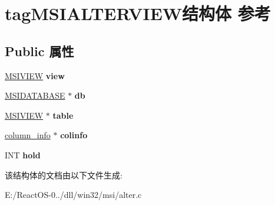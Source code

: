 \hypertarget{structtag_m_s_i_a_l_t_e_r_v_i_e_w}{}\section{tag\+M\+S\+I\+A\+L\+T\+E\+R\+V\+I\+E\+W结构体 参考}
\label{structtag_m_s_i_a_l_t_e_r_v_i_e_w}
\subsection*{Public 属性}
\begin{DoxyCompactItemize}
\item 
\mbox{\label{structtag_m_s_i_a_l_t_e_r_v_i_e_w_a1ff2622c71ed1341f94c834e0ef31007}} 
\hyperlink{structtag_m_s_i_v_i_e_w}{M\+S\+I\+V\+I\+EW} {\bfseries view}
\item 
\mbox{\label{structtag_m_s_i_a_l_t_e_r_v_i_e_w_a18e520ff8bdbdd5097e70ce568dbf18d}} 
\hyperlink{structtag_m_s_i_d_a_t_a_b_a_s_e}{M\+S\+I\+D\+A\+T\+A\+B\+A\+SE} $\ast$ {\bfseries db}
\item 
\mbox{\label{structtag_m_s_i_a_l_t_e_r_v_i_e_w_a269715d4c55ed81d546ea2bafe8646bb}} 
\hyperlink{structtag_m_s_i_v_i_e_w}{M\+S\+I\+V\+I\+EW} $\ast$ {\bfseries table}
\item 
\mbox{\label{structtag_m_s_i_a_l_t_e_r_v_i_e_w_adc2eb1bf79f13bf738edebedab180df9}} 
\hyperlink{struct__column__info}{column\+\_\+info} $\ast$ {\bfseries colinfo}
\item 
\mbox{\label{structtag_m_s_i_a_l_t_e_r_v_i_e_w_a66b908450893613a7171daa4c6eb0334}} 
I\+NT {\bfseries hold}
\end{DoxyCompactItemize}


该结构体的文档由以下文件生成\+:\begin{DoxyCompactItemize}
\item 
E\+:/\+React\+O\+S-\/0../dll/win32/msi/alter.\+c\end{DoxyCompactItemize}
